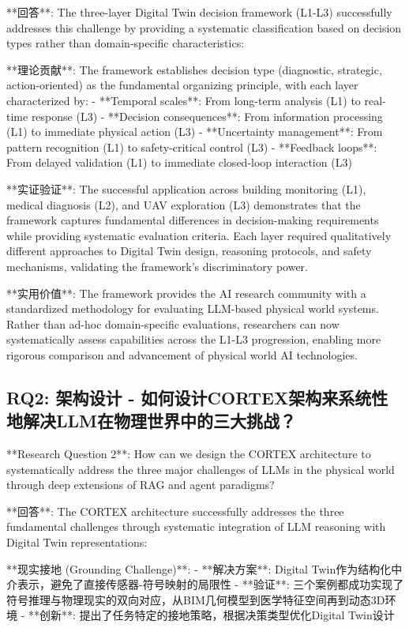 **回答**: The three-layer Digital Twin decision framework (L1-L3) successfully addresses this challenge by providing a systematic classification based on decision types rather than domain-specific characteristics:

**理论贡献**: The framework establishes decision type (diagnostic, strategic, action-oriented) as the fundamental organizing principle, with each layer characterized by:
- **Temporal scales**: From long-term analysis (L1) to real-time response (L3)
- **Decision consequences**: From information processing (L1) to immediate physical action (L3)
- **Uncertainty management**: From pattern recognition (L1) to safety-critical control (L3)
- **Feedback loops**: From delayed validation (L1) to immediate closed-loop interaction (L3)

**实证验证**: The successful application across building monitoring (L1), medical diagnosis (L2), and UAV exploration (L3) demonstrates that the framework captures fundamental differences in decision-making requirements while providing systematic evaluation criteria. Each layer required qualitatively different approaches to Digital Twin design, reasoning protocols, and safety mechanisms, validating the framework's discriminatory power.

**实用价值**: The framework provides the AI research community with a standardized methodology for evaluating LLM-based physical world systems. Rather than ad-hoc domain-specific evaluations, researchers can now systematically assess capabilities across the L1-L3 progression, enabling more rigorous comparison and advancement of physical world AI technologies.

\subsection{RQ2: 架构设计 - 如何设计CORTEX架构来系统性地解决LLM在物理世界中的三大挑战？}

**Research Question 2**: How can we design the CORTEX architecture to systematically address the three major challenges of LLMs in the physical world through deep extensions of RAG and agent paradigms?

**回答**: The CORTEX architecture successfully addresses the three fundamental challenges through systematic integration of LLM reasoning with Digital Twin representations:

**现实接地 (Grounding Challenge)**: 
- **解决方案**: Digital Twin作为结构化中介表示，避免了直接传感器-符号映射的局限性
- **验证**: 三个案例都成功实现了符号推理与物理现实的双向对应，从BIM几何模型到医学特征空间再到动态3D环境
- **创新**: 提出了任务特定的接地策略，根据决策类型优化Digital Twin设计

